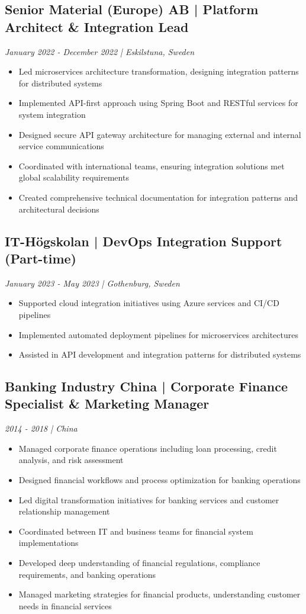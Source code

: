 \documentclass[11pt,a4paper]{article}
\begin{document}
\subsection*{Senior Material (Europe) AB | Platform Architect \& Integration Lead}
\textit{January 2022 - December 2022 | Eskilstuna, Sweden}
\begin{itemize}[noitemsep]
\item Led microservices architecture transformation, designing integration patterns for distributed systems
\item Implemented API-first approach using Spring Boot and RESTful services for system integration
\item Designed secure API gateway architecture for managing external and internal service communications
\item Coordinated with international teams, ensuring integration solutions met global scalability requirements
\item Created comprehensive technical documentation for integration patterns and architectural decisions
\end{itemize}

\subsection*{IT-Högskolan | DevOps Integration Support (Part-time)}
\textit{January 2023 - May 2023 | Gothenburg, Sweden}
\begin{itemize}[noitemsep]
\item Supported cloud integration initiatives using Azure services and CI/CD pipelines
\item Implemented automated deployment pipelines for microservices architectures
\item Assisted in API development and integration patterns for distributed systems
\end{itemize}

\subsection*{Banking Industry China | Corporate Finance Specialist \& Marketing Manager}
\textit{2014 - 2018 | China}
\begin{itemize}[noitemsep]
\item Managed corporate finance operations including loan processing, credit analysis, and risk assessment
\item Designed financial workflows and process optimization for banking operations
\item Led digital transformation initiatives for banking services and customer relationship management
\item Coordinated between IT and business teams for financial system implementations
\item Developed deep understanding of financial regulations, compliance requirements, and banking operations
\item Managed marketing strategies for financial products, understanding customer needs in financial services
\end{itemize}
\end{document}
